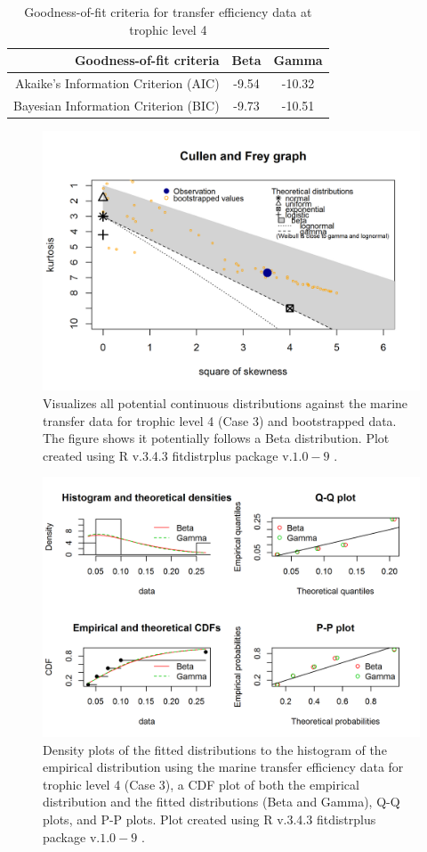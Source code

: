 \documentclass[oneside,12pt,final]{sty/ucthesis-CA2012}
\let\cite\citep                             %
\begin{document}
\begin{mainmatter}
\begin{table}[H]
\centering
\caption{Goodness-of-fit criteria for transfer efficiency data at trophic level 4}
\begin{tabular}{r|c|c}
  \hline \small
 Goodness-of-fit criteria & Beta  & Gamma \\ 
   \hline
   Akaike's Information Criterion (AIC) & -9.54 & -10.32 \\   
   Bayesian Information Criterion (BIC) & -9.73 &  -10.51  \\
   \hline
\end{tabular} 
\label{te4_aic}
\end{table}

\begin{figure}[H]
     \centering
       \includegraphics[width=.8\textwidth]{fig/cullen_frey_te4}
    \caption{Visualizes all potential continuous distributions against the marine transfer data for trophic level 4 (Case 3) and bootstrapped data. The figure shows it potentially follows a Beta distribution. Plot created using R v.3.4.3 \cite{Rcite} fitdistrplus package v.$1.0-9$ \cite{fitdistrplus}. }
    \label{cf_te4}
\end{figure}

\begin{figure}[H]
     \centering
       \includegraphics[width=.8\textwidth]{fig/gof_te4}
    \caption{Density plots of the fitted distributions to the histogram of the empirical distribution using the marine transfer efficiency data for trophic level 4 (Case 3), a CDF plot of both the empirical distribution and the fitted distributions (Beta and Gamma), Q-Q plots, and P-P plots. Plot created using R v.3.4.3 \cite{Rcite} fitdistrplus package v.$1.0-9$ \cite{fitdistrplus}. }
    \label{gof_te4}
\end{figure}


\end{mainmatter}
\end{document}
